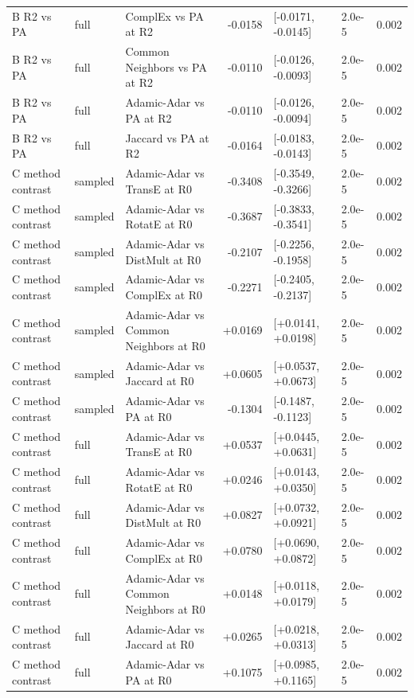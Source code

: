 \begin{tabular}{lllrlll}
B R2 vs PA & full & ComplEx vs PA at R2 & -0.0158 & [-0.0171, -0.0145] & 2.0e-5 & 0.002 \\
B R2 vs PA & full & Common Neighbors vs PA at R2 & -0.0110 & [-0.0126, -0.0093] & 2.0e-5 & 0.002 \\
B R2 vs PA & full & Adamic-Adar vs PA at R2 & -0.0110 & [-0.0126, -0.0094] & 2.0e-5 & 0.002 \\
B R2 vs PA & full & Jaccard vs PA at R2 & -0.0164 & [-0.0183, -0.0143] & 2.0e-5 & 0.002 \\
C method contrast & sampled & Adamic-Adar vs TransE at R0 & -0.3408 & [-0.3549, -0.3266] & 2.0e-5 & 0.002 \\
C method contrast & sampled & Adamic-Adar vs RotatE at R0 & -0.3687 & [-0.3833, -0.3541] & 2.0e-5 & 0.002 \\
C method contrast & sampled & Adamic-Adar vs DistMult at R0 & -0.2107 & [-0.2256, -0.1958] & 2.0e-5 & 0.002 \\
C method contrast & sampled & Adamic-Adar vs ComplEx at R0 & -0.2271 & [-0.2405, -0.2137] & 2.0e-5 & 0.002 \\
C method contrast & sampled & Adamic-Adar vs Common Neighbors at R0 & +0.0169 & [+0.0141, +0.0198] & 2.0e-5 & 0.002 \\
C method contrast & sampled & Adamic-Adar vs Jaccard at R0 & +0.0605 & [+0.0537, +0.0673] & 2.0e-5 & 0.002 \\
C method contrast & sampled & Adamic-Adar vs PA at R0 & -0.1304 & [-0.1487, -0.1123] & 2.0e-5 & 0.002 \\
C method contrast & full & Adamic-Adar vs TransE at R0 & +0.0537 & [+0.0445, +0.0631] & 2.0e-5 & 0.002 \\
C method contrast & full & Adamic-Adar vs RotatE at R0 & +0.0246 & [+0.0143, +0.0350] & 2.0e-5 & 0.002 \\
C method contrast & full & Adamic-Adar vs DistMult at R0 & +0.0827 & [+0.0732, +0.0921] & 2.0e-5 & 0.002 \\
C method contrast & full & Adamic-Adar vs ComplEx at R0 & +0.0780 & [+0.0690, +0.0872] & 2.0e-5 & 0.002 \\
C method contrast & full & Adamic-Adar vs Common Neighbors at R0 & +0.0148 & [+0.0118, +0.0179] & 2.0e-5 & 0.002 \\
C method contrast & full & Adamic-Adar vs Jaccard at R0 & +0.0265 & [+0.0218, +0.0313] & 2.0e-5 & 0.002 \\
C method contrast & full & Adamic-Adar vs PA at R0 & +0.1075 & [+0.0985, +0.1165] & 2.0e-5 & 0.002 \\
\hline
\end{tabular}
